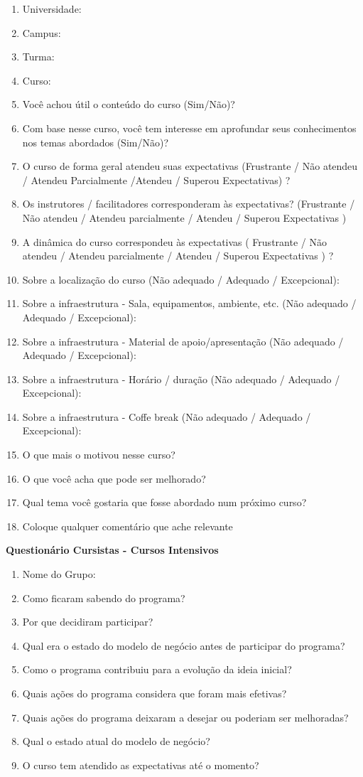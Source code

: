 \begin{anexosenv}
\begin{enumerate}
\item Universidade:
\item Campus:
\item Turma:
\item Curso:
\item Você achou útil o conteúdo do curso (Sim/Não)?
\item Com base nesse curso, você tem interesse em aprofundar seus conhecimentos nos temas abordados (Sim/Não)?
\item O curso de forma geral atendeu suas expectativas (Frustrante / Não atendeu / Atendeu Parcialmente /Atendeu / Superou Expectativas) ?
\item Os instrutores / facilitadores corresponderam às expectativas? (Frustrante / Não atendeu / Atendeu parcialmente / Atendeu / Superou Expectativas )
\item A dinâmica do curso correspondeu às expectativas ( Frustrante / Não atendeu / Atendeu parcialmente / Atendeu / Superou Expectativas ) ? 
\item Sobre a localização do curso (Não adequado / Adequado / Excepcional):
\item Sobre a infraestrutura - Sala, equipamentos, ambiente, etc. (Não adequado / Adequado / Excepcional):
\item Sobre a infraestrutura - Material de apoio/apresentação (Não adequado / Adequado / Excepcional):
\item Sobre a infraestrutura - Horário / duração
(Não adequado / Adequado / Excepcional):
\item Sobre a infraestrutura - Coffe break
(Não adequado / Adequado / Excepcional):
\item O que mais o motivou nesse curso?
\item O que você acha que pode ser melhorado?
\item Qual tema você gostaria que fosse abordado num próximo curso?
\item Coloque qualquer comentário que ache relevante
\end{enumerate}

\clearpage

\textbf{Questionário Cursistas - Cursos Intensivos}

\begin{enumerate}
\item Nome do Grupo:
\item Como ficaram sabendo do programa?
\item Por que decidiram participar?
\item Qual era o estado do modelo de negócio antes de participar do programa?
\item Como o programa contribuiu para a evolução da ideia inicial?
\item Quais ações do programa considera que foram mais efetivas?
\item Quais ações do programa deixaram a desejar ou poderiam ser melhoradas?
\item Qual o estado atual do modelo de negócio?
\item O curso tem atendido as expectativas até o momento?


\end{enumerate}
\end{anexosenv}
